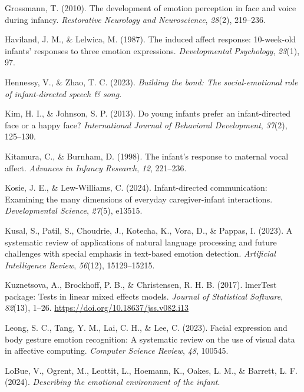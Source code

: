 \documentclass[10pt, letterpaper]{article}
\begin{document}
\begin{CSLReferences}{1}{0}
Grossmann, T. (2010). The development of emotion perception in face and
voice during infancy. \emph{Restorative Neurology and Neuroscience},
\emph{28}(2), 219--236.

Haviland, J. M., \& Lelwica, M. (1987). The induced affect response:
10-week-old infants' responses to three emotion expressions.
\emph{Developmental Psychology}, \emph{23}(1), 97.

Hennessy, V., \& Zhao, T. C. (2023). \emph{Building the bond: The
social-emotional role of infant-directed speech \& song}.

Kim, H. I., \& Johnson, S. P. (2013). Do young infants prefer an
infant-directed face or a happy face? \emph{International Journal of
Behavioral Development}, \emph{37}(2), 125--130.

Kitamura, C., \& Burnham, D. (1998). The infant's response to maternal
vocal affect. \emph{Advances in Infancy Research}, \emph{12}, 221--236.

Kosie, J. E., \& Lew-Williams, C. (2024). Infant-directed communication:
Examining the many dimensions of everyday caregiver-infant interactions.
\emph{Developmental Science}, \emph{27}(5), e13515.

Kusal, S., Patil, S., Choudrie, J., Kotecha, K., Vora, D., \& Pappas, I.
(2023). A systematic review of applications of natural language
processing and future challenges with special emphasis in text-based
emotion detection. \emph{Artificial Intelligence Review}, \emph{56}(12),
15129--15215.

Kuznetsova, A., Brockhoff, P. B., \& Christensen, R. H. B. (2017).
{lmerTest} package: Tests in linear mixed effects models. \emph{Journal
of Statistical Software}, \emph{82}(13), 1--26.
\url{https://doi.org/10.18637/jss.v082.i13}

Leong, S. C., Tang, Y. M., Lai, C. H., \& Lee, C. (2023). Facial
expression and body gesture emotion recognition: A systematic review on
the use of visual data in affective computing. \emph{Computer Science
Review}, \emph{48}, 100545.

LoBue, V., Ogrent, M., Leottit, L., Hoemann, K., Oakes, L. M., \&
Barrett, L. F. (2024). \emph{Describing the emotional environment of the
infant}.


\end{CSLReferences}
\end{document}
